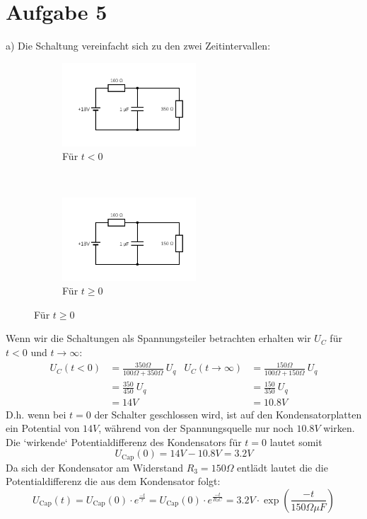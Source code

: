 \documentclass[11pt a4paper]{article}
\begin{document}
\section*{Aufgabe 5}

a) Die Schaltung vereinfacht sich zu den zwei Zeitintervallen:
\begin{figure}[H]
	\centering
	\begin{subfigure}[b]{0.3\textwidth}
		\includegraphics[width=5cm]{aufgabe5a_1.png}
		\caption{Für $t<0$}
	\end{subfigure}
	~
	\begin{subfigure}[b]{0.3\textwidth}
		\includegraphics[width=5cm]{aufgabe5a_2.png}
		\caption{Für $t\geq0$}
	\end{subfigure}
\end{figure}
Wenn wir die Schaltungen als Spannungsteiler betrachten erhalten wir $U_C$ 
für $t < 0$ und $t \rightarrow \infty$:
\begin{align*}
	U_C (t < 0) &= \frac{350 \Omega}{100 \Omega + 350 \Omega} \ U_q
	&
	U_C (t\rightarrow\infty) &= \frac{150\Omega}{100\Omega +
	150 \Omega} \ U_q\\
	&= \frac{350}{450} \ U_q & &= \frac{150}{350} \ U_q \\
	&= 14V & &=10.8V
\end{align*}
D.h. wenn bei $t=0$ der Schalter geschlossen wird, ist auf den 
Kondensatorplatten ein Potential von $14V$, während von der Spannungsquelle
nur noch $10.8V$ wirken.\\
Die `wirkende` Potentialdifferenz des Kondensators für $t=0$ lautet somit
\[ U_\text{Cap} (0) = 14V - 10.8V = 3.2V \]
Da sich der Kondensator am Widerstand $R_3 = 150\Omega$ entlädt lautet die
die Potentialdifferenz die aus dem Kondensator folgt:
\[
	U_\text{Cap} (t) = U_\text{Cap} (0) \cdot e^{\frac{-t}{\tau}}
	= U_\text{Cap} (0) \cdot e^{\frac{-t}{R_3 C}}
	= 3.2 V \cdot \exp\left(\frac{-t}{150\Omega \mu F}\right)
\]
\end{document}
